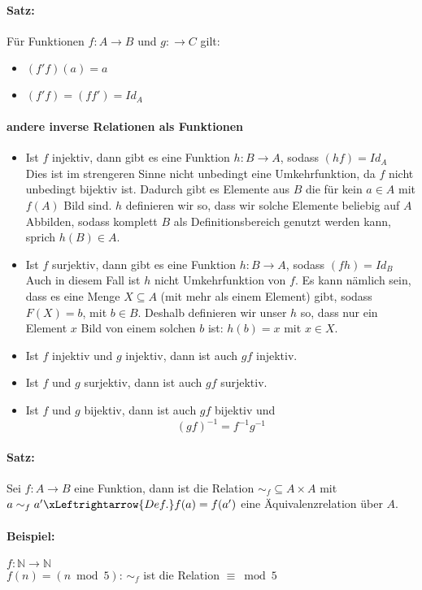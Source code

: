\paragraph{Satz:}Für Funktionen $f:A\rightarrow B$ und $g:\rightarrow C$ gilt:
\begin{itemize}
\item $(f'f)(a)=a$
\item $(f'f)=(ff')=Id_A$
\end{itemize}
\paragraph{andere inverse Relationen als Funktionen}
\begin{itemize}
\item Ist $f$ injektiv, dann gibt es eine Funktion $h:B\rightarrow A$, sodass $(hf)=Id_A$\\
Dies ist im strengeren Sinne nicht unbedingt eine Umkehrfunktion, da $f$ nicht unbedingt bijektiv ist. Dadurch gibt es Elemente aus $B$ die für kein $a\in A$ mit $f(A)$ Bild sind.
$h$ definieren wir so, dass wir solche Elemente beliebig auf $A$ Abbilden, sodass komplett $B$ als Definitionsbereich genutzt werden kann, sprich $h(B)\in A$.
\item Ist $f$ surjektiv, dann gibt es eine Funktion $h:B\rightarrow A$, sodass $(fh)=Id_B$\\
Auch in diesem Fall ist $h$ nicht Umkehrfunktion von $f$. Es kann nämlich sein, dass es eine Menge $X\subseteq A$ (mit mehr als einem Element) gibt, sodass $F(X)=b$, mit $b\in B$.
Deshalb definieren wir unser $h$ so, dass nur ein Element $x$ Bild von einem solchen $b$ ist: $h(b)=x$ mit $x\in X$.
\item Ist $f$ injektiv und $g$ injektiv, dann ist auch $gf$ injektiv.
\item Ist $f$ und $g$ surjektiv, dann ist auch $gf$ surjektiv.
\item Ist $f$ und $g$ bijektiv, dann ist auch $gf$ bijektiv und
\[
(gf)^{-1}=f^{-1}g^{-1}
\]
\end{itemize}

\paragraph{Satz:}Sei $f:A\rightarrow B$ eine Funktion, dann ist die Relation $\sim_f\subseteq A\times A$ mit $a\sim_f a' \xLeftrightarrow{Def.} f(a)=f(a')$ eine Äquivalenzrelation über $A$.
\paragraph{Beispiel:}$f:\mathbb{N}\rightarrow\mathbb{N}$\\
$f(n)=(n \bmod 5)$: $\sim_f$ ist die Relation $\equiv \bmod 5$

